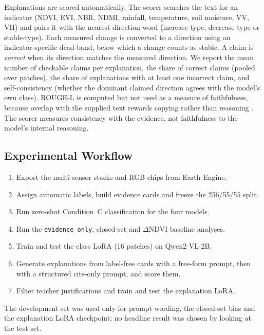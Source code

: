 \documentclass[11pt]{article}
\begin{document}
Explanations are scored automatically. The scorer searches the text for
an indicator (NDVI, EVI, NBR, NDMI, rainfall, temperature, soil
moisture, VV, VH) and pairs it with the nearest direction word
(increase-type, decrease-type or stable-type). Each measured change is
converted to a direction using an indicator-specific dead-band, below
which a change counts as stable. A claim is \emph{correct} when its
direction matches the measured direction. We report the mean number of
checkable claims per explanation, the share of correct claims (pooled
over patches), the share of explanations with at least one incorrect
claim, and self-consistency (whether the dominant claimed direction
agrees with the model's own class). ROUGE-L \citep{lin2004rouge} is
computed but not used as a measure of faithfulness, because overlap with
the supplied text rewards copying rather than reasoning
\citep{jacovi2020}. The scorer measures consistency with the evidence,
not faithfulness to the model's internal reasoning.

\subsection{Experimental Workflow}

\begin{enumerate}
\item Export the multi-sensor stacks and RGB chips from Earth Engine.
\item Assign automatic labels, build evidence cards and freeze the
256/55/55 split.
\item Run zero-shot Condition~C classification for the four models.
\item Run the \texttt{evidence\_only}, closed-set and $\Delta$NDVI
baseline analyses.
\item Train and test the class LoRA (16 patches) on Qwen2-VL-2B.
\item Generate explanations from label-free cards with a free-form
prompt, then with a structured cite-only prompt, and score them.
\item Filter teacher justifications and train and test the explanation
LoRA.
\end{enumerate}

The development set was used only for prompt wording, the closed-set
bias and the explanation LoRA checkpoint; no headline result was chosen
by looking at the test set.

\end{document}
